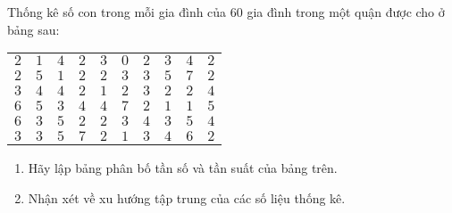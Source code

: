 \begin{bt}
Thống kê số con trong mỗi gia đình của $60$ gia đình trong một quận được cho ở bảng sau:
\begin{center}
\begin{tabular}{|llllllllll|}
\hline 
$2$ & $1$ & $4$ & $2$ & $3$ & $0$ & $2$ & $3$ & $4$ & $2$ \\ 
$2$ & $5$ & $1$ & $2$ & $2$ & $3$ & $3$ & $5$ & $7$ & $2$\\ 
$3$ & $4$ & $4$ & $2$ & $1$ & $2$ & $3$ & $2$ & $2$ & $4$\\
$6$ & $5$ & $3$ & $4$ & $4$ & $7$ & $2$ & $1$ & $1$ & $5$\\
$6$ & $3$ & $5$ & $2$ & $2$ & $3$ & $4$ & $3$ & $5$ & $4$\\
$3$ & $3$ & $5$ & $7$ & $2$ & $1$ & $3$ & $4$ & $6$ & $2$\\
\hline 
\end{tabular}
\end{center}
\begin{enumerate}
\item Hãy lập bảng phân bố tần số và tần suất của bảng trên.
\item Nhận xét về xu hướng tập trung của các số liệu thống kê.
\end{enumerate}
\end{bt}

